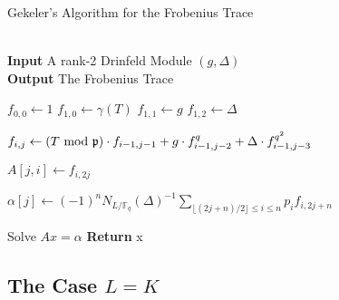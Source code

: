 \documentclass{acmart}
\theoremstyle{remark}
\numberwithin{equation}{section}
\begin{document}
 \begin{algorithm}
\caption{Gekeler's Algorithm for the Frobenius Trace}\label{euclid}
\begin{algorithmic}[1]
\\

\hspace*{\algorithmicindent} \textbf{Input} A rank-2 Drinfeld Module $(g, \Delta)$\\
 \hspace*{\algorithmicindent} \textbf{Output} The Frobenius Trace
 
\State $f_{0,0} \gets 1$
\State $f_{1,0} \gets \gamma(T)$
\State $f_{1,1} \gets g$
\State $f_{1,2} \gets \Delta$

\State $f_{i,j} \gets (T \textnormal{ mod } \mathfrak{p}) \cdot f_{i-1,j-1} + g\cdot f_{i-1,j-2}^q + \Delta \cdot f_{i-1,j-3}^{q^2}$
\EndFor
\EndFor

\State $A[j,i] \gets f_{i,2j} $
\EndFor
\EndFor

\State $ \alpha[j] \gets (-1)^nN_{L/\mathbb{F}_q}(\Delta)^{-1} \sum_{\lfloor (2j+n)/2 \rfloor \leq i \leq n} p_i f_{i,2j + n}$
\EndFor

\State Solve $Ax = \alpha$ 
\State \textbf{Return} x
\EndProcedure
\end{algorithmic}
\end{algorithm}






\subsection{The Case $L = K$}
\end{document}
